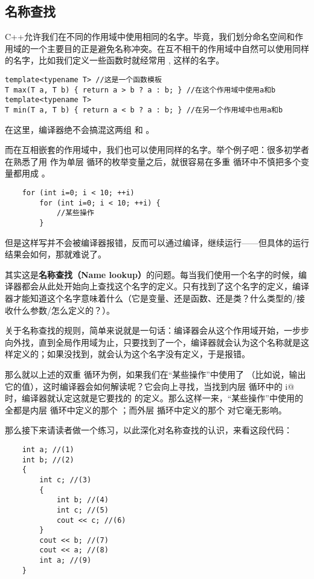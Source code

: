 \subsection*{名称查找}
C++允许我们在不同的作用域中使用相同的名字。毕竟，我们划分命名空间和作用域的一个主要目的正是避免名称冲突。在互不相干的作用域中自然可以使用同样的名字，比如我们定义一些函数时就经常用 \lstinline@a@, \lstinline@b@ 这样的名字。
\begin{lstlisting}
template<typename T> //这是一个函数模板
T max(T a, T b) { return a > b ? a : b; } //在这个作用域中使用a和b
template<typename T>
T min(T a, T b) { return a < b ? a : b; } //在另一个作用域中也用a和b
\end{lstlisting}
在这里，编译器绝不会搞混这两组 \lstinline@a@ 和 \lstinline@b@。\par
而在互相嵌套的作用域中，我们也可以使用同样的名字。举个例子吧：很多初学者在熟悉了用 \lstinline@i@ 作为单层 \lstinline@for@ 循环的枚举变量之后，就很容易在多重 \lstinline@for@ 循环中不慎把多个变量都用成 \lstinline@i@。
\begin{lstlisting}
    for (int i=0; i < 10; ++i) 
        for (int i=0; i < 10; ++i) {
            //某些操作
        }
\end{lstlisting}
但是这样写并不会被编译器报错，反而可以通过编译，继续运行——但具体的运行结果会如何，那就难说了。\par
其实这是\textbf{名称查找（Name lookup）}的问题。每当我们使用一个名字的时候，编译器都会从此处开始向上查找这个名字的定义。只有找到了这个名字的定义，编译器才能知道这个名字意味着什么（它是变量、还是函数、还是类？什么类型的/接收什么参数/怎么定义的？）。\par
关于名称查找的规则，简单来说就是一句话：编译器会从这个作用域开始，一步步向外找，直到全局作用域为止，只要找到了一个，编译器就会认为这个名称就是这样定义的；如果没找到，就会认为这个名字没有定义，于是报错。\par
那么就以上述的双重 \lstinline@for@ 循环为例，如果我们在``某些操作''中使用了 \lstinline@i@（比如说，输出它的值），这时编译器会如何解读呢？它会向上寻找，当找到内层 \lstinline@for@ 循环中的 \lstinline@int i@ 时，编译器就认定这就是它要找的 \lstinline@i@ 的定义。那么这样一来，``某些操作''中使用的 \lstinline@i@ 全都是内层 \lstinline@for@ 循环中定义的那个 \lstinline@i@；而外层 \lstinline@for@ 揗环中定义的那个 \lstinline@i@ 对它毫无影响。\par
那么接下来请读者做一个练习，以此深化对名称查找的认识，来看这段代码：
\begin{lstlisting}
    int a; //(1)
    int b; //(2)
    {
        int c; //(3)
        {
            int b; //(4)
            int c; //(5)
            cout << c; //(6)
        }
        cout << b; //(7)
        cout << a; //(8)
        int a; //(9)
    }
\end{lstlisting}
